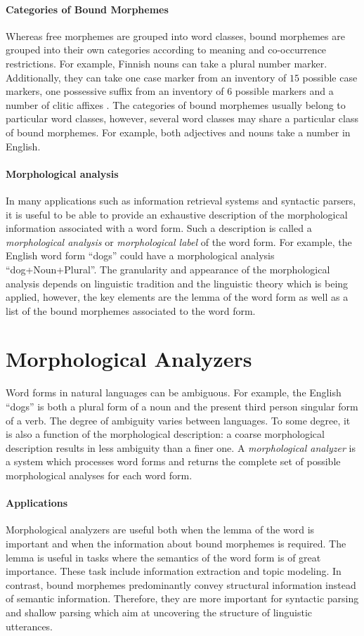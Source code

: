 \paragraph{Categories of Bound Morphemes} Whereas free morphemes are
grouped into word classes, bound morphemes are grouped into their own
categories according to meaning and co-occurrence restrictions. For
example, Finnish nouns can take a plural number
marker. Additionally, they can take one case marker from an inventory
of $15$ possible case markers, one possessive suffix from an inventory
of $6$ possible markers and a number of clitic affixes
\citep{Hakulinen2004}. The categories of bound morphemes usually
belong to particular word classes, however, several word classes may
share a particular class of bound morphemes. For example, both
adjectives and nouns take a number in English.

\paragraph{Morphological analysis} In many applications such as
information retrieval systems and syntactic parsers, it is useful to
be able to provide an exhaustive description of the morphological
information associated with a word form. Such a description is called
a {\it morphological analysis} or {\it morphological label} of the word
form. For example, the English word form ``dogs'' could have a
morphological analysis ``dog+Noun+Plural''. The granularity and
appearance of the morphological analysis depends on linguistic
tradition and the linguistic theory which is being applied, however,
the key elements are the lemma of the word form as well as a list of
the bound morphemes associated to the word form.

\section{Morphological Analyzers}
Word forms in natural languages can be ambiguous. For example, the
English ``dogs'' is both a plural form of a noun and the present third
person singular form of a verb. The degree of ambiguity varies between
languages. To some degree, it is also a function of the morphological
description: a coarse morphological description results in less
ambiguity than a finer one. A {\it morphological analyzer} is a system
which processes word forms and returns the complete set of possible
morphological analyses for each word form.

\paragraph{Applications} Morphological analyzers are useful both when
the lemma of the word is important and when the information about
bound morphemes is required. The lemma is useful in tasks where the
semantics of the word form is of great importance. These task include
information extraction and topic modeling. In contrast, bound
morphemes predominantly convey structural information instead of semantic
information. Therefore, they are more important for syntactic parsing and
shallow parsing which aim at uncovering the structure of linguistic
utterances.

